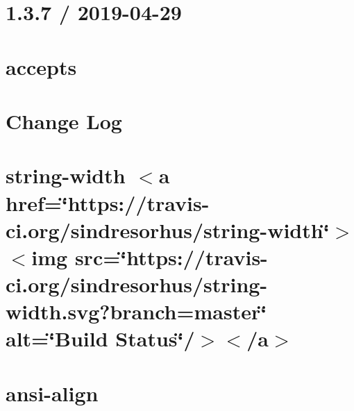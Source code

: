 \let\mypdfximage\pdfximage\def\pdfximage{\immediate\mypdfximage}\documentclass[twoside]{book}
\newcommand{\+}{\discretionary{\mbox{\scriptsize$\hookleftarrow$}}{}{}}
\begin{document}
\chapter{1.3.7 / 2019-\/04-\/29}
\label{md__c_1__git_hub__p_r_o_y_e_c_t_o-_i_i_i-_g_o_t_rest-api-node-mysql_node_modules_accepts__h_i_s_t_o_r_y}

\chapter{accepts}
\label{md__c_1__git_hub__p_r_o_y_e_c_t_o-_i_i_i-_g_o_t_rest-api-node-mysql_node_modules_accepts__r_e_a_d_m_e}

\chapter{Change Log}
\label{md__c_1__git_hub__p_r_o_y_e_c_t_o-_i_i_i-_g_o_t_rest-api-node-mysql_node_modules_ansi-align__c_h_a_n_g_e_l_o_g}

\chapter{string-\/width $<$a href=\char`\"{}https\+://travis-\/ci.\+org/sindresorhus/string-\/width\char`\"{}$>$$<$img src=\char`\"{}https\+://travis-\/ci.\+org/sindresorhus/string-\/width.\+svg?branch=master\char`\"{} alt=\char`\"{}\+Build Status\char`\"{}/$>$$<$/a$>$}
\label{md__c_1__git_hub__p_r_o_y_e_c_t_o-_i_i_i-_g_o_t_rest-api-node-mysql_node_modules_ansi-align_node_modules_string-width_readme}

\chapter{ansi-\/align}
\label{md__c_1__git_hub__p_r_o_y_e_c_t_o-_i_i_i-_g_o_t_rest-api-node-mysql_node_modules_ansi-align__r_e_a_d_m_e}

\end{document}
